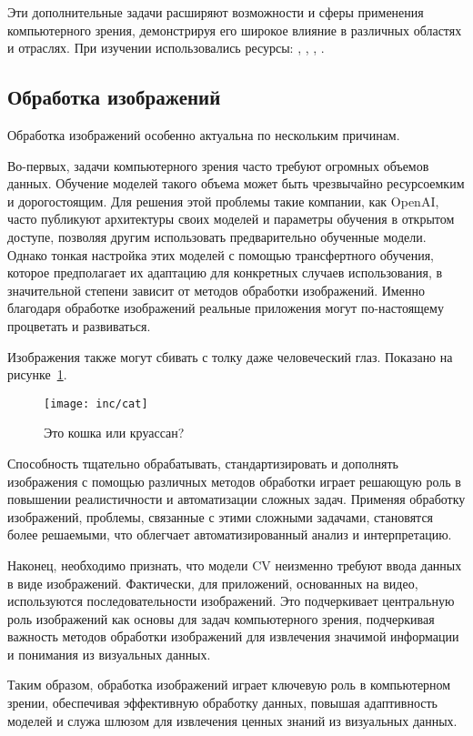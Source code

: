 Эти дополнительные задачи расширяют возможности и сферы применения компьютерного зрения, демонстрируя его широкое влияние в различных областях и отраслях. При изучении использовались ресурсы: \cite{31}, \cite{36}, \cite{32}, \cite{55}.

\subsection{Обработка изображений}

Обработка изображений особенно актуальна по нескольким причинам. 

Во-первых, задачи компьютерного зрения часто требуют огромных объемов данных. Обучение моделей такого объема может быть чрезвычайно ресурсоемким и дорогостоящим. Для решения этой проблемы такие компании, как OpenAI, часто публикуют архитектуры своих моделей и параметры обучения в открытом доступе, позволяя другим использовать предварительно обученные модели. Однако тонкая настройка этих моделей с помощью трансфертного обучения, которое предполагает их адаптацию для конкретных случаев использования, в значительной степени зависит от методов обработки изображений. Именно благодаря обработке изображений реальные приложения могут по-настоящему процветать и развиваться.

Изображения также могут сбивать с толку даже человеческий глаз. Показано на рисунке~\ref{fig:fig01}. 
\begin{figure}
  \texttt{[image: inc/cat]}
  \caption{Это кошка или круассан?}
  \label{fig:fig01}
\end{figure}


Способность тщательно обрабатывать, стандартизировать и дополнять изображения с помощью различных методов обработки играет решающую роль в повышении реалистичности и автоматизации сложных задач. Применяя обработку изображений, проблемы, связанные с этими сложными задачами, становятся более решаемыми, что облегчает автоматизированный анализ и интерпретацию.

Наконец, необходимо признать, что модели CV неизменно требуют ввода данных в виде изображений. Фактически, для приложений, основанных на видео, используются последовательности изображений. Это подчеркивает центральную роль изображений как основы для задач компьютерного зрения, подчеркивая важность методов обработки изображений для извлечения значимой информации и понимания из визуальных данных.

Таким образом, обработка изображений играет ключевую роль в компьютерном зрении, обеспечивая эффективную обработку данных, повышая адаптивность моделей и служа шлюзом для извлечения ценных знаний из визуальных данных.

